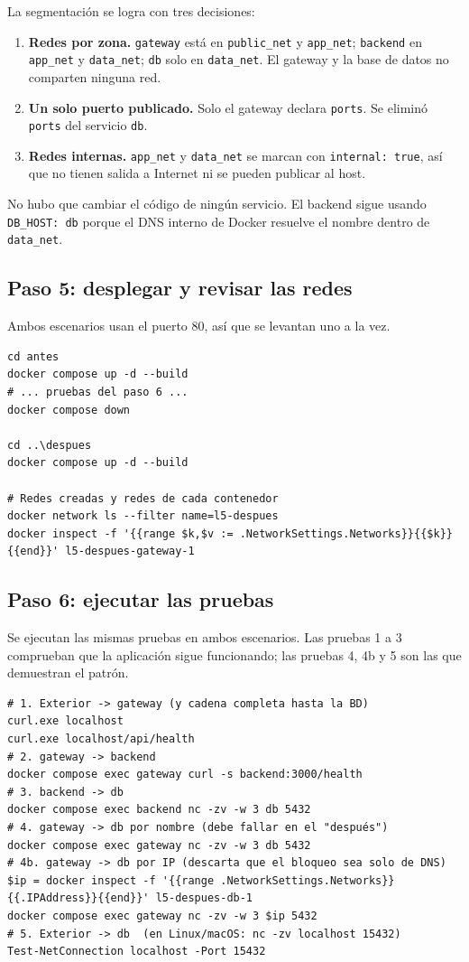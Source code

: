 \documentclass[11pt,letterpaper]{article}
\newcommand{\code}[1]{\texttt{#1}}
\begin{document}
La segmentación se logra con tres decisiones:

\begin{enumerate}
  \item \textbf{Redes por zona.} \code{gateway} está en \code{public\_net} y \code{app\_net}; \code{backend} en \code{app\_net} y \code{data\_net}; \code{db} solo en \code{data\_net}. El gateway y la base de datos no comparten ninguna red.
  \item \textbf{Un solo puerto publicado.} Solo el gateway declara \code{ports}. Se eliminó \code{ports} del servicio \code{db}.
  \item \textbf{Redes internas.} \code{app\_net} y \code{data\_net} se marcan con \code{internal: true}, así que no tienen salida a Internet ni se pueden publicar al host.
\end{enumerate}

No hubo que cambiar el código de ningún servicio. El backend sigue usando
\code{DB\_HOST: db} porque el DNS interno de Docker resuelve el nombre dentro de
\code{data\_net}.

\subsection{Paso 5: desplegar y revisar las redes}

Ambos escenarios usan el puerto 80, así que se levantan uno a la vez.

\begin{lstlisting}[language=shell]
cd antes
docker compose up -d --build
# ... pruebas del paso 6 ...
docker compose down

cd ..\despues
docker compose up -d --build

# Redes creadas y redes de cada contenedor
docker network ls --filter name=l5-despues
docker inspect -f '{{range $k,$v := .NetworkSettings.Networks}}{{$k}} {{end}}' l5-despues-gateway-1
\end{lstlisting}

\subsection{Paso 6: ejecutar las pruebas}

Se ejecutan las mismas pruebas en ambos escenarios. Las pruebas 1 a 3 comprueban que
la aplicación sigue funcionando; las pruebas 4, 4b y 5 son las que demuestran el patrón.

\begin{lstlisting}[language=shell]
# 1. Exterior -> gateway (y cadena completa hasta la BD)
curl.exe localhost
curl.exe localhost/api/health
# 2. gateway -> backend
docker compose exec gateway curl -s backend:3000/health
# 3. backend -> db
docker compose exec backend nc -zv -w 3 db 5432
# 4. gateway -> db por nombre (debe fallar en el "después")
docker compose exec gateway nc -zv -w 3 db 5432
# 4b. gateway -> db por IP (descarta que el bloqueo sea solo de DNS)
$ip = docker inspect -f '{{range .NetworkSettings.Networks}}{{.IPAddress}}{{end}}' l5-despues-db-1
docker compose exec gateway nc -zv -w 3 $ip 5432
# 5. Exterior -> db  (en Linux/macOS: nc -zv localhost 15432)
Test-NetConnection localhost -Port 15432
\end{lstlisting}
\end{document}
